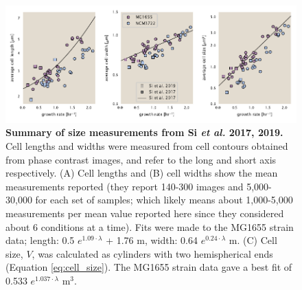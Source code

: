 \begin{figure}
		\centering
    \includegraphics[width=1.0\textwidth]{SI_figs/Si_size_data_fit.pdf}
    \caption{\textbf{Summary of size measurements from Si \textit{et al.} 2017,
    2019.} Cell lengths and widths were measured from cell contours obtained from
    phase contrast images, and refer to the long and short axis respectively. (A)
    Cell lengths and (B) cell widths show the mean measurements reported (they
    report 140-300 images and 5,000-30,000 for each set of samples; which likely
    means about 1,000-5,000 measurements per mean value reported here since they
    considered about 6 conditions at a time). Fits were made to the  MG1655 strain
    data; length: 0.5 $e^{1.09 \cdot \lambda}$ + 1.76 \textmu m, width:  0.64
    $e^{0.24 \cdot \lambda}$ \textmu m. (C) Cell size, $V$, was calculated as
    cylinders with two hemispherical ends (Equation \ref{eq:cell_size}). The
    MG1655 strain data gave a best fit of 0.533 $e^{1.037 \cdot \lambda}$ \textmu m$^3$.}
  \label{fig:final_size_data_Si}
\end{figure}
